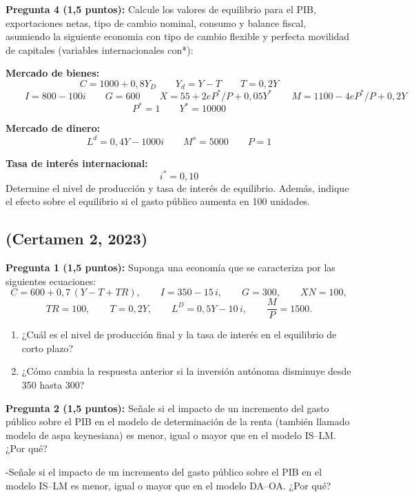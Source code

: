 \documentclass[11pt,addpoints]{article}
\begin{document}
\textbf{Pregunta 4 (1,5 puntos):}  
Calcule los valores de equilibrio para el PIB, exportaciones netas, tipo de cambio nominal, consumo y balance fiscal, asumiendo la siguiente economia con tipo de cambio flexible y perfecta movilidad de capitales (variables internacionales con*):

\vspace{0.2cm}

\textbf{Mercado de bienes:}
\[
C = 1000 + 0{,}8Y_D \qquad Y_d = Y - T \qquad T = 0,2Y
\]
\[
\qquad I = 800 - 100i \qquad G = 600 \qquad X = 55 + 2eP^*/P  +  0,05Y^* \qquad M = 1100 - 4eP^*/P  +  0,2Y 
\]
\[
P^* = 1  \qquad Y^* = 10000
\]

\textbf{Mercado de dinero:}
\[
L^d = 0,4Y - 1000i \qquad M^s = 5000 \qquad P = 1
\]

\textbf{Tasa de interés internacional:}
\[
i^* = 0,10
\]
Determine el nivel de producción y tasa de interés de equilibrio. Además, indique el efecto sobre el equilibrio si el gasto público aumenta en 100 unidades.


\newpage
\vspace*{0.1cm}

\subsection*{(Certamen 2, 2023)}

\textbf{Pregunta 1 (1,5 puntos):}  
Suponga una economía que se caracteriza por las siguientes ecuaciones:
\[
C = 600 + 0{,}7\,(Y - T + TR), \qquad
I = 350 - 15\,i, \qquad
G = 300, \qquad
XN = 100,
\]
\[
TR = 100, \qquad
T = 0{,}2Y, \qquad
L^D = 0{,}5Y - 10\,i, \qquad
\frac{M}{P} = 1500.
\]
\begin{enumerate}[label=\alph*)]
    \item ¿Cuál es el nivel de producción final y la tasa de interés en el equilibrio de corto plazo?  
    \item ¿Cómo cambia la respuesta anterior si la inversión autónoma disminuye desde 350 hasta 300?
\end{enumerate}


\vspace{0.3cm}
\textbf{Pregunta 2 (1,5 puntos):}  
Señale si el impacto de un incremento del gasto público sobre el PIB en el modelo de determinación de la renta (también llamado modelo de aspa keynesiana) es menor, igual o mayor que en el modelo IS–LM. ¿Por qué?

\vspace*{0.1cm}
-Señale si el impacto de un incremento del gasto público sobre el PIB en el modelo IS–LM es menor, igual o mayor que en el modelo DA–OA. ¿Por qué?  
\end{document}
